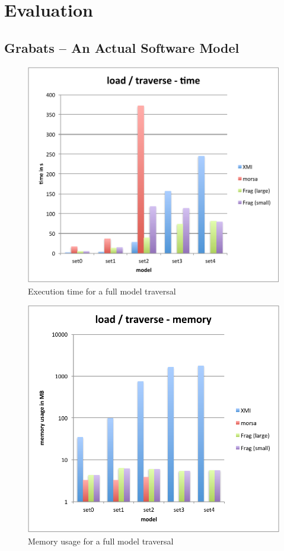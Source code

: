 \section{Evaluation}

\subsection{Grabats -- An Actual Software Model}

\begin{figure}
  \centering
  \includegraphics[width=0.65\linewidth]{figures/grabatsLoadTraverse}
  \caption{Execution time for a full model traversal}
\end{figure}

\begin{figure}
  \centering
  \includegraphics[width=0.65\linewidth]{figures/grabatsLoadTraverseMem}
  \caption{Memory usage for a full model traversal}
\end{figure}

